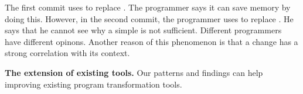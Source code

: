 The first commit uses  to replace . The programmer says it can save memory by doing this. However, in the second commit, the programmer uses  to replace . He says that he cannot see why a simple  is not sufficient. Different programmers have different opinons. Another reason of this phenomenon is that a change has a strong correlation with its context.

\noindent
\textbf{The extension of existing tools.} Our patterns and findings can help improving existing program transformation tools.